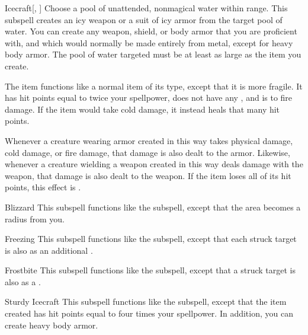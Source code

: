 \begin{ability}[\nth{2}]{Icecraft}[, ]
Choose a pool of unattended, nonmagical water within \rngclose range.
This subspell creates an icy weapon or a suit of icy armor from the target pool of water.
You can create any weapon, shield, or body armor that you are proficient with, and which would normally be made entirely from metal, except for heavy body armor.
The pool of water targeted must be at least as large as the item you create.

The item functions like a normal item of its type, except that it is more fragile.
It has hit points equal to twice your spellpower, does not have any , and is  to fire damage.
If the item would take cold damage, it instead heals that many hit points.

Whenever a creature wearing armor created in this way takes physical damage, cold damage, or fire damage, that damage is also dealt to the armor.
Likewise, whenever a creature wielding a weapon created in this way deals damage with the weapon, that damage is also dealt to the weapon.
If the item loses all of its hit points, this effect is .
\end{ability}
\vspace{0.25em}


\begin{ability}[\nth{3}]{Blizzard}
This subspell functions like the  subspell, except that the area becomes a \areamed radius from you.
\end{ability}
\vspace{0.25em}


\begin{ability}[\nth{4}]{Freezing}
This subspell functions like the  subspell, except that each struck target is also  as an additional .
\end{ability}
\vspace{0.25em}


\begin{ability}[\nth{4}]{Frostbite}
This subspell functions like the  subspell, except that a struck target is also  as a .
\end{ability}
\vspace{0.25em}


\begin{ability}[\nth{4}]{Sturdy Icecraft}
This subspell functions like the  subspell, except that the item created has hit points equal to four times your spellpower.
In addition, you can create heavy body armor.
\end{ability}
\vspace{0.25em}


